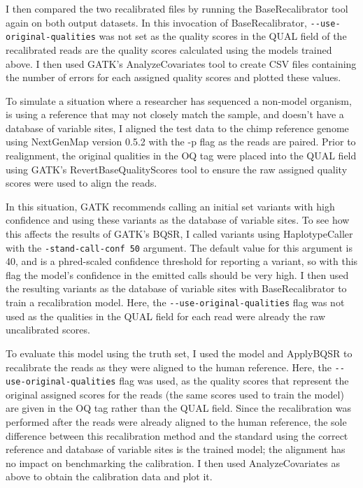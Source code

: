 I then compared the two recalibrated files by running the BaseRecalibrator tool again on both output datasets. In this invocation of BaseRecalibrator, \texttt{-\phantom{}-use-original-qualities} was not set as the quality scores in the QUAL field of the recalibrated reads are the quality scores calculated using the models trained above. I then used GATK's AnalyzeCovariates tool to create CSV files containing the number of errors for each assigned quality scores and plotted these values.

To simulate a situation where a researcher has sequenced a non-model organism, is using a reference that may not closely match the sample, and doesn't have a database of variable sites, I aligned the test data to the chimp reference genome \parencite{waterson_initial_2005} using NextGenMap \parencite{sedlazeck_nextgenmap_2013} version 0.5.2 with the -p flag as the reads are paired. Prior to realignment, the original qualities in the OQ tag were placed into the QUAL field using GATK's RevertBaseQualityScores tool to ensure the raw assigned quality scores were used to align the reads.

In this situation, GATK recommends calling an initial set variants with high confidence and using these variants as the database of variable sites. %
To see how this affects the results of GATK's BQSR, I called variants using HaplotypeCaller with the \texttt{-stand-call-conf 50} argument. The default value for this argument is 40, and is a phred-scaled confidence threshold for reporting a variant, so with this flag the model's confidence in the emitted calls should be very high. I then used the resulting variants as the database of variable sites with BaseRecalibrator to train a recalibration model. Here, the \texttt{-\phantom{}-use-original-qualities} flag was not used as the qualities in the QUAL field for each read were already the raw uncalibrated scores.

To evaluate this model using the truth set, I used the model and ApplyBQSR to recalibrate the reads as they were aligned to the human reference. Here, the \texttt{-\phantom{}-use-original-qualities} flag was used, as the quality scores that represent the original assigned scores for the reads (the same scores used to train the model) are given in the OQ tag rather than the QUAL field. Since the recalibration was performed after the reads were already aligned to the human reference, the sole difference between this recalibration method and the standard using the correct reference and database of variable sites is the trained model; the alignment has no impact on benchmarking the calibration. I then used AnalyzeCovariates as above to obtain the calibration data and plot it.

